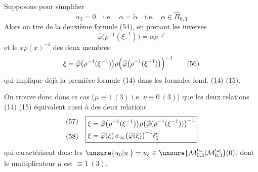 Supposons pour simplifier
\[
\alpha_3=0\quad\text{i.e.}\quad\alpha=\widetilde\alpha\quad\text{i.e.}\quad\alpha\in\widehat\Pi_{0,3}
\tag{55}
\]
Alors on tire de la deuxième formule (54), en prenant les inverses
\[
\widehat{\varphi}\bigl(\rho^{-1}(\xi^{-1})\bigr)=\alpha\rho^{-j'}
\]
et le $x\rho(x)^{-1}$ des deux membres
\[
\xi=\widehat{\varphi}\bigl(\rho^{-1}(\xi^{-1})\bigr)\rho\Bigl(\widehat{\varphi}\bigl(\rho^{-1}(\xi^{-1})\bigr)\Bigr)^{-1}
\tag{56}
\]
qui implique déjà la première formule (14) dans les formules fond. (14) (15).


On trouve donc dans ce cas ($\mu\equiv1\ (3)$ i.e.
$\nu\equiv0\ (3)$) que les deux relations (14) (15)
équivalent aussi à  des deux relations
\[
\begin{array}{c@{\quad}c}
\begin{gathered}(57)\\[1.5ex](58)\end{gathered}&
\boxed{\begin{aligned}
\xi&=
\widehat\varphi\bigl(\rho^{-1}(\xi^{-1})\bigr)
\rho\bigl(\widehat\varphi(\rho^{-1}(\xi^{-1}))\bigr)^{-1}
\\
\xi&=\widehat\varphi(\xi)\,
\sigma_\infty\bigl(\widehat\varphi(\xi)\bigr)^{-1}
\ell_1^\nu
\end{aligned}}
\end{array}
\]
qui caractérisent donc les
$\unsure{u_0|u_{\cdot}}=u_{\xi}\in
\unsure{\mathcal M_{0,3}^{!\sim}|\mathcal M_{0,3}^{!\approx}}(0)$,
dont le multiplicateur $\mu$ est $\equiv1\ (3)$.

